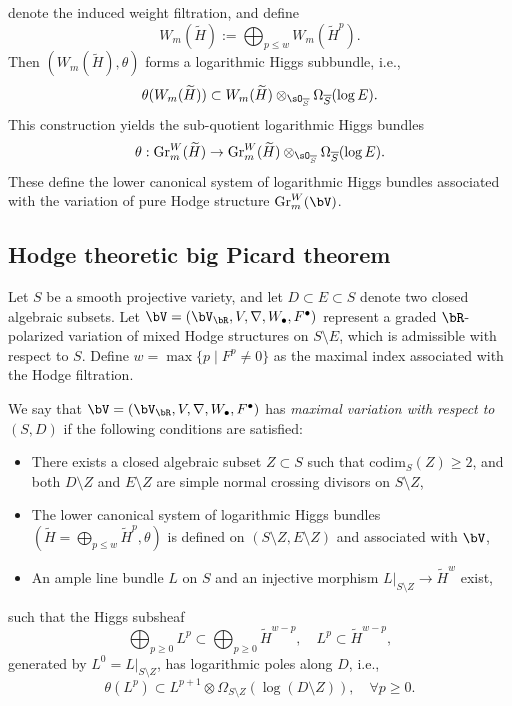 \documentclass[11pt,letterpaper]{amsart}
\numberwithin{equation}{section}
\begin{document}
	denote the induced weight filtration, and define  
	$$  
	W_m(\widetilde{H}) := \bigoplus_{p\leq w} W_m(\widetilde{H}^p).  
	$$  
	Then $(W_m(\widetilde{H}), \theta)$ forms a logarithmic Higgs subbundle, i.e.,  
	$$  
	\theta(W_m(\widetilde{H})) \subset W_m(\widetilde{H}) \otimes_{\sO_{\overline{S}}} \Omega_{\overline{S}}(\log E).  
	$$  
	This construction yields the sub-quotient logarithmic Higgs bundles  
	\begin{align}  
		\theta: {\rm Gr}^W_m(\widetilde{H}) \to {\rm Gr}^W_m(\widetilde{H}) \otimes_{\sO_{\overline{S}}} \Omega_{\overline{S}}(\log E).  
	\end{align}  
	These define the lower canonical system of logarithmic Higgs bundles associated with the variation of pure Hodge structure ${\rm Gr}^W_m(\bV)$. 
	\subsection{Hodge theoretic big Picard theorem}\label{section_VZ_Finsler_metric}
	Let $S$ be a smooth projective variety, and let $D \subset E \subset S$ denote two closed algebraic subsets. Let $\bV = (\bV_{\bR}, V, \nabla, W_\bullet, F^\bullet)$ represent a graded $\bR$-polarized variation of mixed Hodge structures on $S \setminus E$, which is admissible with respect to $S$. Define $w = \max\{p \mid F^p \neq 0\}$ as the maximal index associated with the Hodge filtration.
	\begin{defn}\label{defn_VMHS_maxvar}
		We say that $\bV = (\bV_{\bR}, V, \nabla, W_\bullet, F^\bullet)$ has \emph{maximal variation with respect to $(S, D)$} if the following conditions are satisfied:  
		\begin{itemize}  
			\item There exists a closed algebraic subset $Z \subset S$ such that $\mathrm{codim}_S(Z) \geq 2$, and both $D \setminus Z$ and $E \setminus Z$ are simple normal crossing divisors on $S \setminus Z$,  
			\item The lower canonical system of logarithmic Higgs bundles $(\widetilde{H} = \bigoplus_{p\leq w}\widetilde{H}^p, \theta)$ is defined on $(S \setminus Z, E \setminus Z)$ and associated with $\bV$,  
			\item An ample line bundle $L$ on $S$ and an injective morphism $L|_{S \setminus Z} \to \widetilde{H}^w$ exist,  
		\end{itemize}  
		such that the Higgs subsheaf  
		$$  
		\bigoplus_{p\geq0}L^p \subset \bigoplus_{p\geq0} \widetilde{H}^{w-p}, \quad L^p \subset \widetilde{H}^{w-p},  
		$$  
		generated by $L^0 = L|_{S \setminus Z}$, has logarithmic poles along $D$, i.e.,  
		$$  
		\theta(L^p) \subset L^{p+1} \otimes \Omega_{S \setminus Z}(\log (D \setminus Z)), \quad \forall p \geq 0.  
		$$
	\end{defn}
\end{document}
